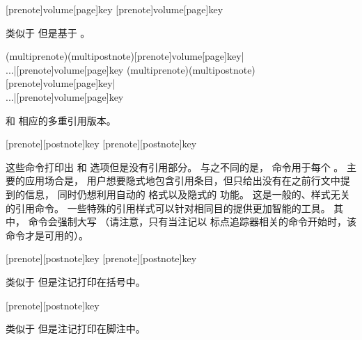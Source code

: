 \begin{ltxsyntax}
[prenote]{volume}[page]{key}
[prenote]{volume}[page]{key}

类似于  但是基于 。

(multiprenote)(multipostnote)[prenote]{volume}[page]{key}|\\...|[prenote]{volume}[page]{key}
(multiprenote)(multipostnote)[prenote]{volume}[page]{key}|\\...|[prenote]{volume}[page]{key}

 和  相应的多重引用版本。

[prenote][postnote]{key}
[prenote][postnote]{key}


这些命令打印出  和  选项但是没有引用部分。
与之不同的是， 命令用于每个 。
主要的应用场合是，
用户想要隐式地包含引用条目，但只给出没有在之前行文中提到的信息，
同时仍想利用自动的  格式以及隐式的  功能。
这是一般的、样式无关的引用命令。
一些特殊的引用样式可以针对相同目的提供更加智能的工具。
其中， 命令会强制大写
（请注意，只有当注记以 \biblatex 标点追踪器相关的命令开始时，该命令才是可用的）。

[prenote][postnote]{key}
[prenote][postnote]{key}

类似于  但是注记打印在括号中。

[prenote][postnote]{key}

类似于  但是注记打印在脚注中。

\end{ltxsyntax}

